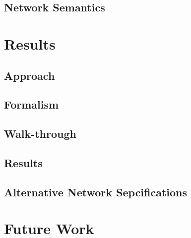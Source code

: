 \documentclass{thesis}
\begin{document}
  \section{Network Semantics}

  \chapter{Results}
  \section{Approach}
  \section{Formalism}
  \section{Walk-through}
  \section{Results}
  \section{Alternative Network Sepcifications}

  \chapter{Future Work}
\end{document}
